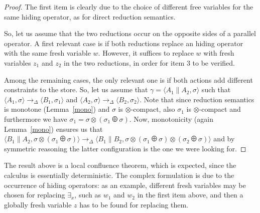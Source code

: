 \documentclass[main.tex]{subfiles}
\begin{document}
\begin{proof}%
	The first item is clearly due to the choice of different free variables 
	for the same hiding operator, as for direct reduction semantics.
	
	So, let us assume that the two reductions occur on the opposite sides of a parallel operator.
	A first relevant case is if both reductions replace an hiding operator with the same fresh variable
	$w$. However, it suffices to replace $w$ 
	with fresh variables $z_1$ and $z_2$ in  the two reductions, in order for item 3 to be verified.
		
	Among the remaining cases, the only relevant one is if both actions add 
	different constraints to the store.
	So, let us assume that $\gamma = \langle A_1 \parallel A_2, \sigma \rangle$ such that 
	$\langle A_1, \sigma \rangle \rightarrow_\Delta \langle B_1, \sigma_1 \rangle$
	and
	$\langle A_2, \sigma \rangle \rightarrow_\Delta \langle B_2, \sigma_2 \rangle$.
	Note that since reduction semantics is monotone (Lemma~\ref{mono})
	and $\sigma$ is $\otimes$-compact, also $\sigma_1$
	is $\otimes$-compact and furthermore we have
	$\sigma_1 = \sigma \otimes (\sigma_1 \odiv \sigma)$.
	Now,  monotonicity (again Lemma~\ref{mono}) ensures us that
	$\langle B_1 \parallel A_2, \sigma \otimes (\sigma_1 \odiv \sigma) \rangle
	\rightarrow_\Delta
	\langle B_1 \parallel B_2, \sigma \otimes (\sigma_1 \odiv \sigma) \otimes (\sigma_2 \odiv \sigma) \rangle$ 
	and by symmetric reasoning the latter configuration 
	is the one we were looking for.
\end{proof}


The result above is a local confluence theorem, which is expected, since the calculus is essentially deterministic.
The complex formulation is  due to the occurrence of hiding operators: as an example, different fresh variables may be chosen
for replacing $\exists_x$, such as  $w_1$ and $w_2$ in the first item above, and then a globally fresh variable $z$ has to 
be found for replacing them.
\end{document}
